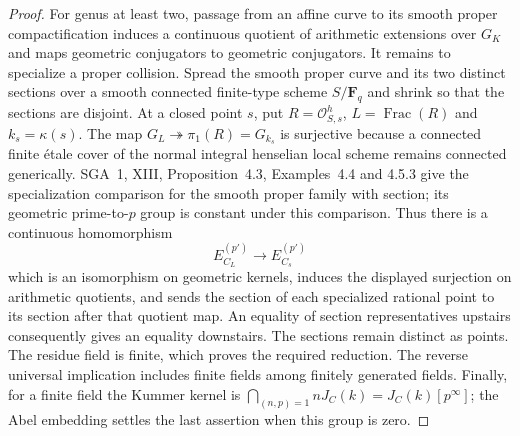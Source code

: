 \begin{proof}
For genus at least two, passage from an affine curve to its smooth
proper compactification induces a continuous quotient of arithmetic
extensions over $G_K$ and maps geometric conjugators to geometric
conjugators.  It remains to specialize a proper collision.  Spread the
smooth proper curve and its two distinct sections over a smooth
connected finite-type scheme $S/\mathbf F_q$ and shrink so that the
sections are disjoint.  At a closed point $s$, put
$R=\mathcal O_{S,s}^{h}$, $L=\operatorname{Frac}(R)$ and
$k_s=\kappa(s)$.  The map $G_L\twoheadrightarrow\pi_1(R)=G_{k_s}$ is
surjective because a connected finite \'etale cover of the normal
integral henselian local scheme remains connected generically.
SGA~1, XIII, Proposition~4.3, Examples~4.4 and 4.5.3 give the
specialization comparison for the smooth proper family with section;
its geometric prime-to-$p$ group is constant under this comparison.
Thus there is a continuous homomorphism
\[
 E_{C_L}^{(p')}\longrightarrow E_{C_s}^{(p')}
\]
which is an isomorphism on geometric kernels, induces the displayed
surjection on arithmetic quotients, and sends the section of each
specialized rational point to its section after that quotient map.
An equality of section representatives upstairs consequently gives an
equality downstairs.  The sections remain distinct as points.  The
residue field is finite, which proves the required reduction.  The
reverse universal implication includes finite fields among finitely
generated fields.  Finally, for a finite field the Kummer kernel is
$\bigcap_{(n,p)=1}nJ_C(k)=J_C(k)[p^\infty]$; the Abel embedding
settles the last assertion when this group is zero.
\end{proof}

